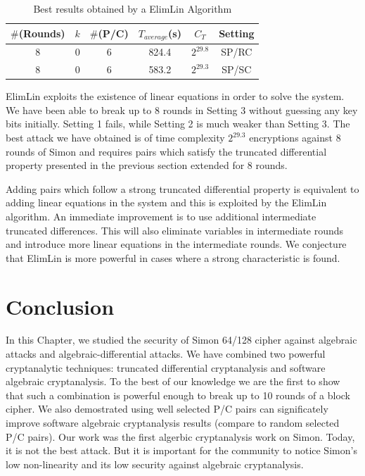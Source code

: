 \begin{table}[!h]
\caption{Best results obtained by a ElimLin Algorithm}\label{tab:SimonElimlin} \centering
\begin{tabular}{|c|c|c|c|c|c|}
  \hline
  $\#$(Rounds) & $k$ & $\#$(P/C) & $T_{average}$(s) & $C_T$ & Setting \\
  \hline
  8 & 0 & 6 & 824.4 & $2^{29.8}$ & SP/RC \\
 \hline
 8 & 0 & 6 & 583.2 & $2^{29.3}$ & SP/SC \\
  \hline
\end{tabular}
\end{table}

ElimLin exploits the existence of linear equations in order to solve the system. We have been able to break up to 8 rounds in Setting 3 without guessing any key bits
initially. Setting 1 fails, while Setting 2 is much weaker than Setting 3. The best
attack we have obtained is of time complexity $2^{29.3}$ encryptions against 8 rounds of Simon and requires pairs which satisfy
the truncated differential property presented in the previous section extended for 8 rounds.

Adding pairs which follow a strong truncated differential property is equivalent to adding linear equations in the system and this
is exploited by the ElimLin algorithm. An immediate improvement is to use additional intermediate truncated differences.
This will also eliminate variables in intermediate rounds and introduce more linear
equations in the intermediate rounds. We conjecture that ElimLin is more powerful
in cases where a strong characteristic is found.

\section{Conclusion}
In this Chapter, we studied the security of Simon 64/128 cipher against algebraic attacks and algebraic-differential attacks. We have combined two powerful cryptanalytic techniques: truncated differential cryptanalysis and software algebraic
cryptanalysis. To the best of our knowledge we are the first to show
that such a combination is powerful enough to break up to 10 rounds of a
block cipher. We also demostrated using well selected P/C pairs can significately improve software algebraic cryptanalysis results (compare to random selected P/C pairs). Our work was the first algerbic cryptanalysis work on Simon. Today, it is not the best attack. But it is important for the community to notice Simon's low non-linearity and its low security against algebraic cryptanalysis. 






